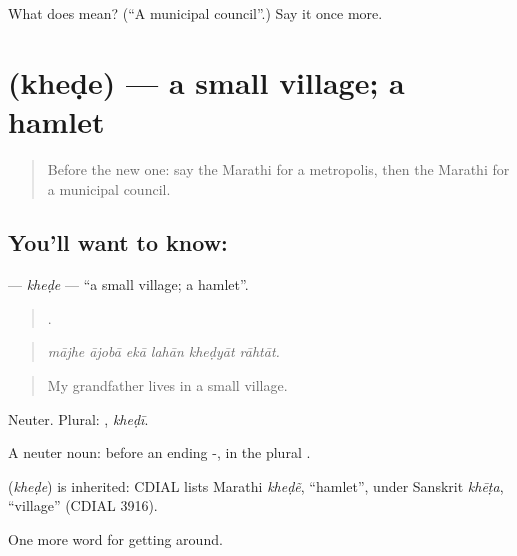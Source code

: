 \begin{tcolorbox}[breakable,colback=teal!4,colframe=teal!35!black,title={Before you move on}]
What does  mean? (\textquotedblleft{}A municipal council\textquotedblright{}.) Say it once more.
\end{tcolorbox}
\section[\texorpdfstring{\mr{खेडे} (kheḍe)}{खेडे (kheḍe)}]{ (kheḍe) — a small village; a hamlet}

\label{lesson:MR-C418-khede}



\begin{quote}
Before the new one: say the Marathi for a metropolis, then the Marathi for a municipal council.
\end{quote}

\subsection*{You'll want to know: }
\textbf{} — \emph{kheḍe} — \textquotedblleft{}a small village; a hamlet\textquotedblright{}.

\begin{quote}
     .
\end{quote}

\begin{quote}
\emph{mājhe ājobā ekā lahān kheḍyāt rāhtāt.}
\end{quote}

\begin{quote}
My grandfather lives in a small village.
\end{quote}

Neuter. Plural: , \emph{kheḍī}.

A neuter noun: before an ending -, in the plural .

\begin{cousinweb}
\textbf{} (\emph{kheḍe}) is inherited: CDIAL lists Marathi \emph{kheḍẽ}, \textquotedblleft{}hamlet\textquotedblright{}, under Sanskrit \emph{khēṭa}, \textquotedblleft{}village\textquotedblright{} (CDIAL 3916).
\end{cousinweb}

\begin{grammarlens}[title={What you've built}]
One more word for getting around.
\end{grammarlens}

